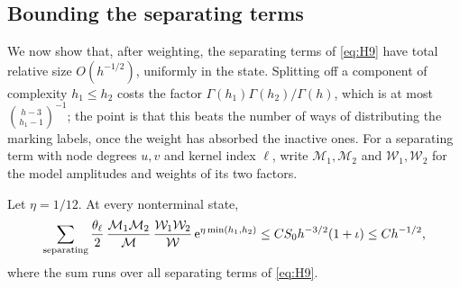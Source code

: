 \subsection{Bounding the separating terms}\label{the-weighted-separating-estimate}

We now show that, after weighting, the separating terms of
\eqref{eq:H9} have total relative size \(O(h^{-1/2})\), uniformly in the
state. Splitting off a component of complexity \(h_1\le h_2\) costs the
factor \(\Gamma(h_1)\Gamma(h_2)/\Gamma(h)\), which is at most
\(\binom{h-3}{h_1-1}^{-1}\); the point is that this beats the number of
ways of distributing the marking labels, once the weight has absorbed the
inactive ones. For a separating term with node degrees \(u,v\) and kernel
index \(\ell\), write \(\mathcal M_1,\mathcal M_2\) and
\(\mathcal W_1,\mathcal W_2\) for the model amplitudes and weights of its two
factors.

\begin{lemma}\label{lem:weighted-separating}
Let \(\eta=1/12\). At every nonterminal state,
\[
 \sum_{\rm separating}\frac{\theta_\ell}{2}\,
 \frac{\mathcal M_1\mathcal M_2}{\mathcal M}\,
 \frac{\mathcal W_1\mathcal W_2}{\mathcal W}\,
 \mathrm e^{\eta\min(h_1,h_2)}
 \le CS_0h^{-3/2}(1+\iota)\le Ch^{-1/2},
\]
where the sum runs over all separating terms of \eqref{eq:H9}.
\end{lemma}

